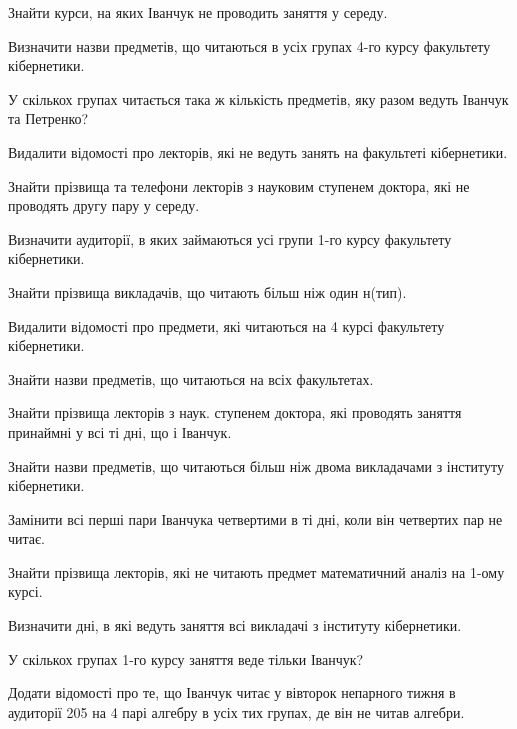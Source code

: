 \begin{card}
    \item Знайти курси, на яких Іванчук не проводить заняття у середу.
    \item Визначити назви предметів, що читаються в усіх групах 4-го курсу факультету кібернетики.
    \item У скількох групах читається така ж кількість предметів, яку разом ведуть Іванчук та Петренко?
    \item Видалити відомості про лекторів, які не ведуть занять на факультеті кібернетики.
\end{card}

\begin{card}
    \item Знайти прізвища та телефони лекторів з науковим ступенем доктора, які не проводять другу пару у середу.
    \item Визначити аудиторії, в яких займаються усі групи 1-го курсу факультету кібернетики.
    \item Знайти прізвища викладачів, що читають більш ніж один н (тип).
    \item Видалити відомості про предмети, які читаються на 4 курсі факультету кібернетики.
\end{card}

\begin{card}
    \item Знайти назви предметів, що читаються на всіх факультетах.
    \item Знайти прізвища лекторів з наук. ступенем доктора, які проводять заняття принаймні у всі ті дні, що і Іванчук.
    \item Знайти назви предметів, що читаються більш ніж двома викладачами з інституту кібернетики.
    \item Замінити всі перші пари Іванчука четвертими в ті дні, коли він четвертих пар не читає.
\end{card}

\begin{card}
    \item Знайти прізвища лекторів, які не читають предмет математичний аналіз на 1-ому курсі.
    \item Визначити дні, в які ведуть заняття всі викладачі з інституту кібернетики.
    \item У скількох групах 1-го курсу заняття веде тільки Іванчук?
    \item Додати відомості про те, що Іванчук читає у вівторок непарного тижня в аудиторії 205 на 4 парі алгебру в усіх тих групах, де він не читав алгебри.
\end{card}

